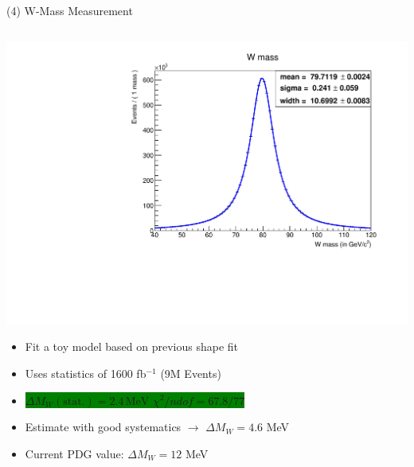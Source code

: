 \documentclass[10pt]{beamer}
\begin{document}
\begin{frame}{(4) W-Mass Measurement }
\begin{columns}
\begin{column}{0.5\textwidth}
\includegraphics[scale=0.3, left]{Wtoyfit.pdf} \\
\begin{itemize}
\item Fit a toy model based on previous shape fit
\item Uses statistics of 1600 fb$^{-1}$ (9M Events)
\item \colorbox{green}{$\Delta M_W (\text{stat.}) = 2.4 \, \text{MeV} \, \, \chi^2/ndof = 67.8/77$ }
\item Estimate with good systematics $\rightarrow$ $\Delta M_W = 4.6$ MeV
\item Current PDG value: $\Delta M_W = 12$ MeV
\end{itemize}
\end{column}
\end{columns}
\quad \quad \\
\quad \quad \\

\end{frame}
\end{document}
